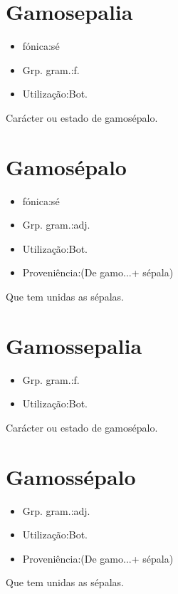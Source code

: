 \section{Gamosepalia}
\begin{itemize}
\item {fónica:sé}
\end{itemize}
\begin{itemize}
\item {Grp. gram.:f.}
\end{itemize}
\begin{itemize}
\item {Utilização:Bot.}
\end{itemize}
Carácter ou estado de gamosépalo.
\section{Gamosépalo}
\begin{itemize}
\item {fónica:sé}
\end{itemize}
\begin{itemize}
\item {Grp. gram.:adj.}
\end{itemize}
\begin{itemize}
\item {Utilização:Bot.}
\end{itemize}
\begin{itemize}
\item {Proveniência:(De \textunderscore gamo...\textunderscore  + \textunderscore sépala\textunderscore )}
\end{itemize}
Que tem unidas as sépalas.
\section{Gamossepalia}
\begin{itemize}
\item {Grp. gram.:f.}
\end{itemize}
\begin{itemize}
\item {Utilização:Bot.}
\end{itemize}
Carácter ou estado de gamosépalo.
\section{Gamossépalo}
\begin{itemize}
\item {Grp. gram.:adj.}
\end{itemize}
\begin{itemize}
\item {Utilização:Bot.}
\end{itemize}
\begin{itemize}
\item {Proveniência:(De \textunderscore gamo...\textunderscore  + \textunderscore sépala\textunderscore )}
\end{itemize}
Que tem unidas as sépalas.
